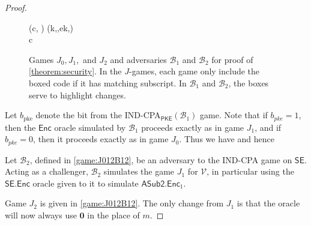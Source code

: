 \begin{proof}
\begin{figure}[t]
\begin{pchstack}
\begin{pcvstack}
{	\pcind (c, \tau) \sample {}(k,,ek,\tau) \\
	\pcreturn c
}
\pcvspace
{}
\end{pcvstack}
\end{pchstack}
\caption[Games $J_0,J_1,$ and $J_2$ and adversaries $\mathcal{B}_1$ and $\mathcal{B}_2$ for proof of \autoref{theorem:security}]{Games $J_0,J_1,$ and $J_2$ and adversaries $\mathcal{B}_1$ and $\mathcal{B}_2$ for proof of \autoref{theorem:security}. In the $J$-games, each game only include the boxed code if it has matching subscript. In $\mathcal{B}_1$ and $\mathcal{B}_2$, the boxes serve to highlight changes.}
\label{game:J012B12}
\end{figure}

Let $b_\text{pke}$ denote the bit from the IND-CPA$_\mathsf{PKE}(\mathcal{B}_1)$ game. Note that if $b_{pke}=1$, then the $\mathsf{Enc}$ oracle simulated by $\mathcal{B}_1$ proceeds exactly as in game $J_1$, and if $b_{pke}=0$, then it proceeds exactly as in game $J_0$. Thus we have
and hence

Let $\mathcal{B}_2$, defined in \autoref{game:J012B12}, be an adversary to the IND-CPA game on $\mathsf{SE}$. Acting as a challenger, $\mathcal{B}_2$ simulates the game $J_1$ for $\mathcal{V}$, in particular using the $\mathsf{SE.Enc}$ oracle given to it to simulate $\mathsf{ASub2.Enc}_1$.

Game $J_2$ is given in \autoref{game:J012B12}. The only change from $J_1$ is that the oracle will now always use $\mathbf{0}$ in the place of $m$.


\end{proof}
